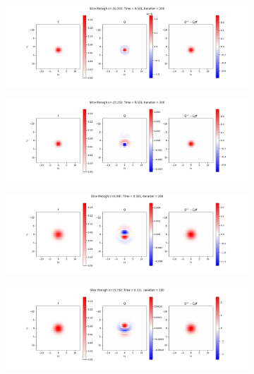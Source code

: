 \documentclass{article}
\begin{document}
\begin{figure}[H]
  \begin{subfigure}[b]{\textwidth}
    \includegraphics[width=\textwidth]{imgs/ts_output2/slice0/mat200.png}
  \end{subfigure}
  \hfill
  \begin{subfigure}[b]{\textwidth}
    \includegraphics[width=\textwidth]{imgs/ts_output2/slice25/mat200.png}
  \end{subfigure}
  \hfill
  \begin{subfigure}[b]{\textwidth}
    \includegraphics[width=\textwidth]{imgs/ts_output2/slice50/mat200.png}
  \end{subfigure}
  \hfill
  \begin{subfigure}[b]{\textwidth}
    \includegraphics[width=\textwidth]{imgs/ts_output2/slice75/mat200.png}
  \end{subfigure}
\end{figure}
\end{document}
